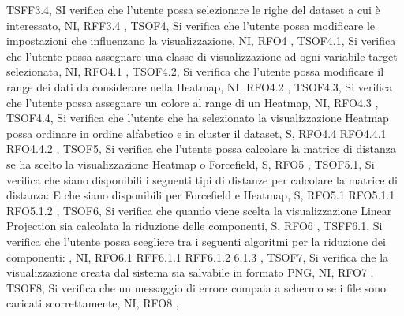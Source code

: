 {    {   
        TSFF3.4,
        SI verifica che l'utente possa selezionare le righe del dataset a cui è interessato,
        NI,
        RFF3.4
    },
    {   
        TSOF4,
        Si verifica che l'utente possa modificare le impostazioni che influenzano la visualizzazione,
        NI,
        RFO4
    },
    {   
        TSOF4.1,
        Si verifica che l'utente possa assegnare una classe di visualizzazione ad ogni variabile target selezionata,
        NI,
        RFO4.1
    },
    {   
        TSOF4.2,
        Si verifica che l'utente possa modificare il range dei dati da considerare nella Heatmap,
        NI,
        RFO4.2
    },
    {   
        TSOF4.3,
        Si verifica che l'utente possa assegnare un colore al range di un Heatmap,
        NI,
        RFO4.3
    },
    {   
        TSOF4.4,
        Si verifica che l'utente che ha selezionato la visualizzazione Heatmap possa ordinare in ordine alfabetico e in cluster il dataset,
        S,
        RFO4.4 RFO4.4.1 RFO4.4.2
    },
    {   
        TSOF5,
        Si verifica che l'utente possa calcolare la matrice di distanza se ha scelto la visualizzazione Heatmap o Forcefield,
        S,
        RFO5
    },    
    {   
        TSOF5.1,
        Si verifica che siano disponibili i seguenti tipi di distanze per calcolare la matrice di distanza:
        E che siano disponibili per Forcefield e Heatmap,
        S,
        RFO5.1 RFO5.1.1 RFO5.1.2
    },
    {   
        TSOF6,
        Si verifica che quando viene scelta la visualizzazione Linear Projection sia calcolata la riduzione delle componenti,
        S,
        RFO6
    },
    {   
        TSFF6.1,
        Si verifica che l'utente possa scegliere tra i seguenti algoritmi per la riduzione dei componenti:
        ,
        NI,
        RFO6.1 RFF6.1.1 RFF6.1.2 6.1.3
    },
    {   
        TSOF7,
        Si verifica che la visualizzazione creata dal sistema sia salvabile in formato PNG,
        NI,
        RFO7
    },
    {   
        TSOF8,
        Si verifica che un messaggio di errore compaia a schermo se i file sono caricati scorrettamente,
        NI,
        RFO8
    },
    }
    
    
